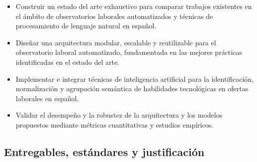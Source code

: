 \begin{itemize}
    \item Construir un estado del arte exhaustivo para comparar trabajos existentes en el ámbito de observatorios laborales automatizados y técnicas de procesamiento de lenguaje natural en español.

    \item Diseñar una arquitectura modular, escalable y reutilizable para el observatorio laboral automatizado, fundamentada en las mejores prácticas identificadas en el estado del arte.

    \item Implementar e integrar técnicas de inteligencia artificial para la identificación, normalización y agrupación semántica de habilidades tecnológicas en ofertas laborales en español.

    \item Validar el desempeño y la robustez de la arquitectura y los modelos propuestos mediante métricas cuantitativas y estudios empíricos.
\end{itemize}

\subsection{Entregables, estándares y justificación}

